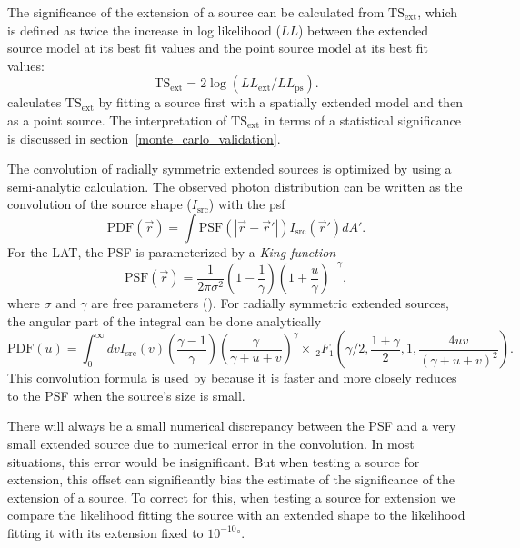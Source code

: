 \documentclass[12pt,preprint]{aastex}
\newcommand{\tsext}{{\ensuremath{\text{TS}_\text{ext}}}\xspace}
\newcommand{\loglikelihood}{\ensuremath{LL}\xspace}
\renewcommand{\deg}{\ensuremath{^\circ}\xspace}
\newcommand{\pointlike}{\text{\em pointlike}\xspace}
\begin{document}
The significance of the extension of a source can be calculated from
\tsext, which is defined as twice the increase in log likelihood (\loglikelihood)
between
the extended source model at its best fit values and the point source
model at its best fit values:
\begin{equation}
  \tsext=2\log(\loglikelihood_\text{ext}/\loglikelihood_\text{ps}).
\end{equation}
\pointlike calculates \tsext by fitting a source first with a spatially
extended model and then as a point source.  The interpretation
of \tsext in terms of a statistical significance is discussed in
section~\ref{monte_carlo_validation}.

The convolution of radially symmetric extended sources is optimized by
using a semi-analytic calculation.  The observed photon distribution
can be written as the convolution of the source shape ($I_\text{src}$)
with the psf
\begin{equation}
  \text{PDF}(\vec r) = \int  \text{PSF}(|\vec r - \vec r'|)I_\text{src}(\vec r') d A'.
\end{equation}
For the LAT, the PSF is parameterized by a {\em King function}
\begin{equation}
  \text{PSF}(\vec r) = 
  \frac{1}{2\pi\sigma^2}
  \left(1-\frac{1}{\gamma}\right)
  \left(1+\frac{u}{\gamma}\right)^{-\gamma},
\end{equation}
where $\sigma$ and $\gamma$ are free parameters
(\cite{matthew_kerr_thesis}).  For radially symmetric extended sources,
the angular part of the integral can be done analytically
\begin{equation}
  \text{PDF}(u)= \int_0^\infty dv
  I_\text{src}(v) 
  \left(\frac{\gamma-1}{\gamma}\right)
  \left( \frac{\gamma}{\gamma + u + v}\right)^\gamma 
  \times ~_2F_1 \left(\gamma/2,\frac{1+\gamma}{2},1,\frac{4uv}{(\gamma+u+v)^2}\right).
\end{equation}
This convolution formula is used by \pointlike because it is faster
and more closely reduces to the PSF when the source's size is 
small.

There will always be a small numerical discrepancy between the PSF and
a very small extended source due to numerical error in the convolution.
In most situations, this error would be insignificant. But when testing
a source for extension, this offset can significantly bias the estimate
of the significance of the extension of a source.  To correct for this,
when testing a source for extension we compare the likelihood fitting
the source with an extended shape to the likelihood fitting it with its
extension fixed to ${10^{-10}}\deg$.
\end{document}
